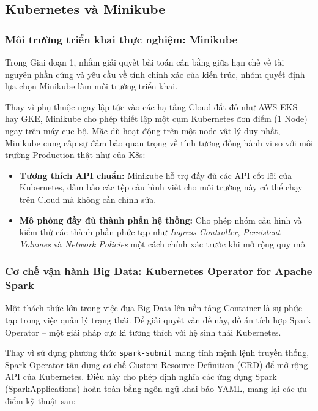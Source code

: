 \subsection{Kubernetes và Minikube}

\subsubsection{Môi trường triển khai thực nghiệm: Minikube}
Trong Giai đoạn 1, nhằm giải quyết bài toán cân bằng giữa hạn chế về tài nguyên phần cứng và yêu cầu về tính chính xác của kiến trúc, nhóm quyết định lựa chọn Minikube làm môi trường triển khai.

Thay vì phụ thuộc ngay lập tức vào các hạ tầng Cloud đắt đỏ như AWS EKS hay GKE, Minikube cho phép thiết lập một cụm Kubernetes đơn điểm (1 Node) ngay trên máy cục bộ. Mặc dù hoạt động trên một node vật lý duy nhất, Minikube cung cấp sự đảm bảo quan trọng về tính tương đồng hành vi so với môi trường Production thật như của K8s: 
\begin{itemize} 
    \item \textbf{Tương thích API chuẩn:} Minikube hỗ trợ đầy đủ các API cốt lõi của Kubernetes, đảm bảo các tệp cấu hình viết cho môi trường này có thể chạy trên Cloud mà không cần chỉnh sửa. 
    \item \textbf{Mô phỏng đầy đủ thành phần hệ thống:} Cho phép nhóm cấu hình và kiểm thử các thành phần phức tạp như \textit{Ingress Controller}, \textit{Persistent Volumes} và \textit{Network Policies} một cách chính xác trước khi mở rộng quy mô. 
\end{itemize}

\subsubsection{Cơ chế vận hành Big Data: Kubernetes Operator for Apache Spark} Một thách thức lớn trong việc đưa Big Data lên nền tảng Container là sự phức tạp trong việc quản lý trạng thái. Để giải quyết vấn đề này, đồ án tích hợp Spark Operator – một giải pháp cực kì tương thích với hệ sinh thái Kubernetes.

Thay vì sử dụng phương thức \texttt{spark-submit} mang tính mệnh lệnh truyền thống, Spark Operator tận dụng cơ chế Custom Resource Definition (CRD) để mở rộng API của Kubernetes. Điều này cho phép định nghĩa các ứng dụng Spark (SparkApplications) hoàn toàn bằng ngôn ngữ khai báo YAML, mang lại các ưu điểm kỹ thuật sau:

